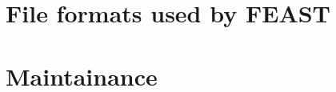 \documentclass[10pt,a4paper]{report}
\begin{document}
\chapter{File formats used by FEAST}




\chapter{Maintainance}
















%


\end{document}
